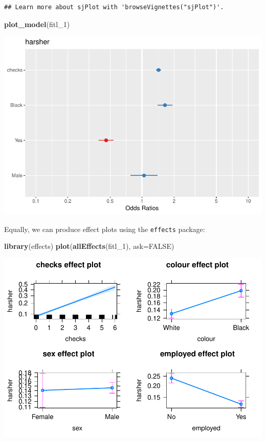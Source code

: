\documentclass[]{book}
\newenvironment{Shaded}{\begin{snugshade}}{\end{snugshade}}
\newcommand{\DataTypeTok}[1]{\textcolor[rgb]{0.13,0.29,0.53}{#1}}
\newcommand{\DecValTok}[1]{\textcolor[rgb]{0.00,0.00,0.81}{#1}}
\newcommand{\KeywordTok}[1]{\textcolor[rgb]{0.13,0.29,0.53}{\textbf{#1}}}
\newcommand{\NormalTok}[1]{#1}
\newcommand{\OtherTok}[1]{\textcolor[rgb]{0.56,0.35,0.01}{#1}}
\theoremstyle{definition}
\theoremstyle{definition}
\theoremstyle{definition}
\theoremstyle{remark}
\begin{document}
\begin{verbatim}
## Learn more about sjPlot with 'browseVignettes("sjPlot")'.
\end{verbatim}

\begin{Shaded}
\begin{Highlighting}[]
\KeywordTok{plot_model}\NormalTok{(fitl_}\DecValTok{1}\NormalTok{)}
\end{Highlighting}
\end{Shaded}

\includegraphics{09-logistic_files/figure-latex/unnamed-chunk-11-1.pdf}

Equally, we can produce effect plots using the \texttt{effects} package:

\begin{Shaded}
\begin{Highlighting}[]
\KeywordTok{library}\NormalTok{(effects)}
\KeywordTok{plot}\NormalTok{(}\KeywordTok{allEffects}\NormalTok{(fitl_}\DecValTok{1}\NormalTok{), }\DataTypeTok{ask=}\OtherTok{FALSE}\NormalTok{)}
\end{Highlighting}
\end{Shaded}

\includegraphics{09-logistic_files/figure-latex/unnamed-chunk-12-1.pdf}
\end{document}
